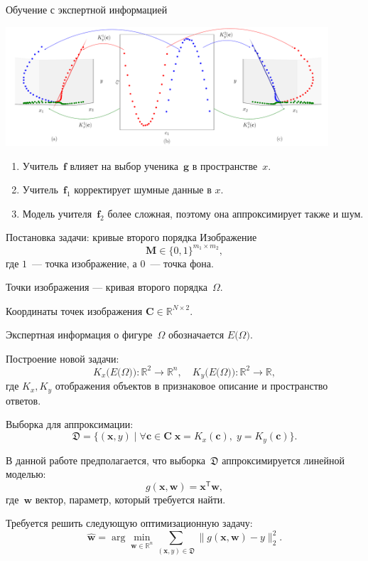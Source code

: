 \documentclass[10pt,pdf,hyperref={unicode}]{beamer}
\begin{document}

\begin{frame}{Обучение с экспертной информацией}
\justifying
\begin{center}
	\includegraphics[width=0.9\textwidth]{figures/explanation}
\end{center}

\begin{enumerate}
    \item Учитель~$\mathbf{f}$ влияет на выбор ученика~$\mathbf{g}$ в пространстве~$x$.
    \item Учитель~$\mathbf{f}_1$ корректирует шумные данные в $x$.
    \item Модель учителя~$\mathbf{f}_2$ более сложная, поэтому она аппроксимирует также и шум.
\end{enumerate}

\end{frame}


\begin{frame}{Постановка задачи: кривые второго порядка}
\justifying
Изображение
\[
\mathbf{M} \in \{0,1\}^{m_1\times m_2},
\]
где $1$~--- точка изображение,  а $0$~--- точка фона. 

Точки изображения --- кривая второго порядка~$\Omega$.

Координаты точек изображения $\mathbf{C} \in \mathbb{R}^{N\times2}$.

Экспертная информация о фигуре~$\Omega$ обозначается $E\bigr(\Omega\bigr)$.

Построение новой задачи:
\[
K_x\bigr(E\bigr(\Omega\bigr)\bigr):\mathbb{R}^{2} \to \mathbb{R}^{n},
\quad K_y\bigr(E\bigr(\Omega\bigr)\bigr): \mathbb{R}^{2} \to \mathbb{R},
\]
где $K_x, K_y$ отображения объектов в признаковое описание и пространство ответов.

Выборка для аппроксимации:
\[
\mathfrak{D} = \{(\mathbf{x}, y) \; | \; \forall \mathbf{c} \in \mathbf{C} \; \mathbf{x} = K_x(\mathbf{c}), \; y = K_y(\mathbf{c}) \}.
\]

В данной работе предполагается, что выборка~$\mathfrak{D}$ аппроксимируется линейной моделью:
\[
	g(\mathbf{x}, \mathbf{w}) = \mathbf{x}^\mathsf{T} \mathbf{w},
\]
где~$\mathbf{w}$ вектор, параметр, который требуется найти.


Требуется решить следующую оптимизационную задачу:
\[
	\hat{\mathbf{w}} = \arg\min_{\mathbf{w}\in\mathbb{R}^n} \sum_{\left(\mathbf{x}, y\right) \in \mathfrak{D}}\|g(\mathbf{x}, \mathbf{w}) - y \|_2^2.
\]
\end{frame}
\end{document}

